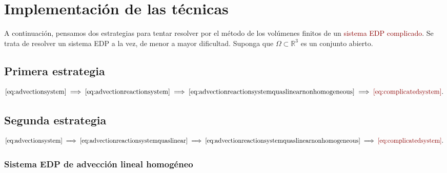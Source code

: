 \chapter{Implementación de las técnicas}

A continuación, pensamos dos estrategias para tentar resolver por el
método de los volúmenes finitos de un
\textcolor{DarkRed}{sistema EDP complicado}.
Se trata de resolver un sistema EDP a la vez, de menor a mayor
dificultad.
Suponga que $\Omega\subset\mathbb{R}^{3}$ es un conjunto abierto.

\section{Primera estrategia}

\begin{equation*}
	\eqref{eq:advectionsystem}\implies
	\eqref{eq:advectionreactionsystem}\implies
	\eqref{eq:advectionreactionsystemquaslinearnonhomogeneous}\implies
	\mathcolor{DarkRed}{\eqref{eq:complicatedsystem}}.
\end{equation*}

\section{Segunda estrategia}

\begin{equation*}
	\eqref{eq:advectionsystem}\implies
	\eqref{eq:advectionreactionsystemquaslinear}\implies
	\eqref{eq:advectionreactionsystemquaslinearnonhomogeneous}\implies
	\mathcolor{DarkRed}{\eqref{eq:complicatedsystem}}.
\end{equation*}

\subsection*{Sistema EDP de advección lineal homogéneo}

